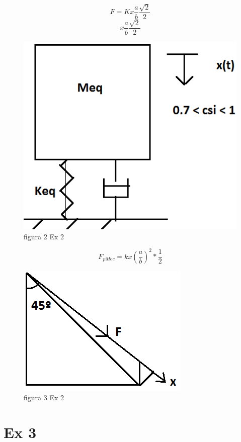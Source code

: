 \documentclass[a4paper, 12pt]{article}
\begin{document}
\[F = Kx\frac{a}{b}\frac{\sqrt{2}}{2}\]
\[x\frac{a}{b}\frac{\sqrt{2}}{2}\]

 
\begin{figure}[h]
\begin{center}
\includegraphics[scale=0.38]{./fig/3.png}
\caption{\label{fig:tur}figura 2  Ex 2} 
\end{center}
\end{figure}

\[F_{pMec}=kx(\frac{a}{b})^{2}*\frac{1}{2}\]

\begin{figure}[h]
\begin{center}
\includegraphics[scale=0.48]{./fig/4.png}
\caption{\label{fig:tur}figura 3  Ex 2} 
\end{center}
\end{figure}

\section{Ex 3}
\end{document}
